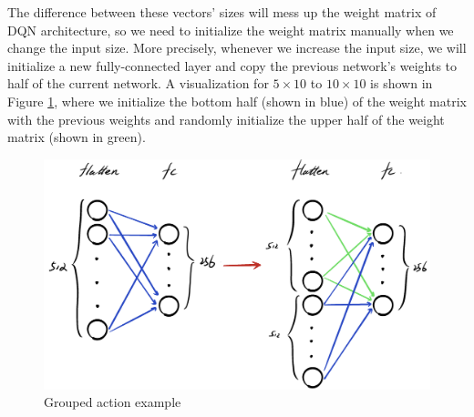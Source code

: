 \documentclass[letterpaper]{article} %
\begin{document}
  The difference between these vectors' sizes will mess up the weight matrix of DQN architecture, so we need to initialize the weight matrix manually when we change the input size. More precisely, whenever we increase the input size, we will initialize a new fully-connected layer and copy the previous network's weights to half of the current network. A visualization for $5\times 10$ to $10\times 10$ is shown in Figure \ref{fig:training}, where we initialize the bottom half (shown in blue) of the weight matrix with the previous weights and randomly initialize the upper half of the weight matrix (shown in green).

  \begin{figure}[h!]
    \centering
    \includegraphics[width=0.75\linewidth]{figures/architecutre.jpeg}
    \caption{Grouped action example}
    \label{fig:training}
  \end{figure}
  
\newpage
\end{document}
